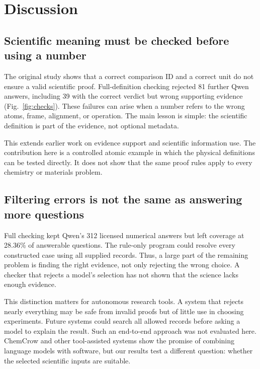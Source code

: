 \section{Discussion}
\label{sec:discussion}

\subsection{Scientific meaning must be checked before using a number}

The original study shows that a correct comparison ID and a correct unit do not ensure a valid scientific proof. Full-definition checking rejected 81 further Qwen answers, including 39 with the correct verdict but wrong supporting evidence (Fig.~\ref{fig:checks}). These failures can arise when a number refers to the wrong atoms, frame, alignment, or operation. The main lesson is simple: the scientific definition is part of the evidence, not optional metadata.

This extends earlier work on evidence support and scientific information use.\cite{gao2023enabling,yu2026scicueval} The contribution here is a controlled atomic example in which the physical definitions can be tested directly. It does not show that the same proof rules apply to every chemistry or materials problem.

\subsection{Filtering errors is not the same as answering more questions}

Full checking kept Qwen's 312 licensed numerical answers but left coverage at 28.36\% of answerable questions. The rule-only program could resolve every constructed case using all supplied records. Thus, a large part of the remaining problem is finding the right evidence, not only rejecting the wrong choice. A checker that rejects a model's selection has not shown that the science lacks enough evidence.

This distinction matters for autonomous research tools. A system that rejects nearly everything may be safe from invalid proofs but of little use in choosing experiments. Future systems could search all allowed records before asking a model to explain the result. Such an end-to-end approach was not evaluated here. ChemCrow and other tool-assisted systems show the promise of combining language models with software, but our results test a different question: whether the selected scientific inputs are suitable.\cite{bran2024augmenting,gao2023pal}

